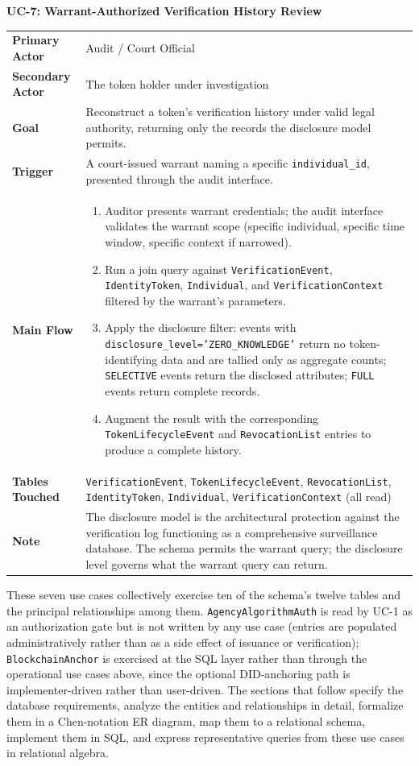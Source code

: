 \documentclass[11pt,letterpaper]{article}
\newcommand{\entity}[1]{\texttt{\color{navydark}#1}}
\newcommand{\usecase}[2]{%
  \needspace{3\baselineskip}%
  \vspace{6pt}%
  \noindent\colorbox{tabheader}{\parbox{\dimexpr\textwidth-2\fboxsep}{%
    \color{white}\small\bfseries\textsc{#1:} \mdseries #2}}%
  \nopagebreak[4]%
  \vspace{2pt}%
  \nopagebreak[4]%
}
\begin{document}
\usecase{UC-7}{Warrant-Authorized Verification History Review}
\noindent\begin{xltabular}{\textwidth}{>{\bfseries}p{1.4in} >{\RaggedRight\arraybackslash}X}
Primary Actor & Audit / Court Official \\
Secondary Actor & The token holder under investigation \\
Goal & Reconstruct a token's verification history under valid legal authority, returning only the records the disclosure model permits. \\
Trigger & A court-issued warrant naming a specific \texttt{individual\_id}, presented through the audit interface. \\
Main Flow &
\begin{enumerate}
  \item Auditor presents warrant credentials; the audit interface validates the warrant scope (specific individual, specific time window, specific context if narrowed).
  \item Run a join query against \entity{VerificationEvent}, \entity{IdentityToken}, \entity{Individual}, and \entity{VerificationContext} filtered by the warrant's parameters.
  \item Apply the disclosure filter: events with \texttt{disclosure\_level='ZERO\_KNOWLEDGE'} return no token-identifying data and are tallied only as aggregate counts; \texttt{SELECTIVE} events return the disclosed attributes; \texttt{FULL} events return complete records.
  \item Augment the result with the corresponding \entity{TokenLifecycleEvent} and \entity{RevocationList} entries to produce a complete history.
\end{enumerate} \\
Tables Touched & \entity{VerificationEvent}, \entity{TokenLifecycleEvent}, \entity{RevocationList}, \entity{IdentityToken}, \entity{Individual}, \entity{VerificationContext} (all read) \\
Note & The disclosure model is the architectural protection against the verification log functioning as a comprehensive surveillance database. The schema permits the warrant query; the disclosure level governs what the warrant query can return. \\
\end{xltabular}

\vspace{6pt}
These seven use cases collectively exercise ten of the schema's twelve tables and the principal relationships among them. \entity{AgencyAlgorithmAuth} is read by UC-1 as an authorization gate but is not written by any use case (entries are populated administratively rather than as a side effect of issuance or verification); \entity{BlockchainAnchor} is exercised at the SQL layer rather than through the operational use cases above, since the optional DID-anchoring path is implementer-driven rather than user-driven. The sections that follow specify the database requirements, analyze the entities and relationships in detail, formalize them in a Chen-notation ER diagram, map them to a relational schema, implement them in SQL, and express representative queries from these use cases in relational algebra.
\end{document}

